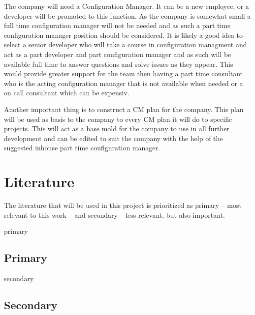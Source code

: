 \documentclass[a4paper]{article}
\begin{document}
The company will need a Configuration Manager. It can be a new employee, or a developer will be promoted to this function. As the company is somewhat small a full time configuration manager will not be needed and as such a part time configuration manager position should be considered. It is likely a good idea to select a senior developer who will take a course in configuration managment and act as a part developer and part configuration manager and as such will be available full time to answer questions and solve issues as they appear. This would provide greater support for the team then having a part time consultant who is the acting configuration manager that is not available when needed or a on call consultant which can be expensiv.

Another important thing is to construct a CM plan for the company. This plan will be used as basis to the company to every CM plan it will do to specific projects. This will act as a base mold for the company to use in all further development and can be edited to suit the company with the help of the suggested inhouse part time configuration manager.



\newpage
\appendix
\section{Literature}

The literature that will be used in this project is prioritized as primary -- most relevant to this work -- and secondary -- less relevant, but also important. 
\begin{btSect}[alpha]{primary}
\subsection{Primary}
\btPrintAll
\end{btSect}

\begin{btSect}[alpha]{secondary}
\subsection{Secondary}
\btPrintAll
\end{btSect}
\end{document}
